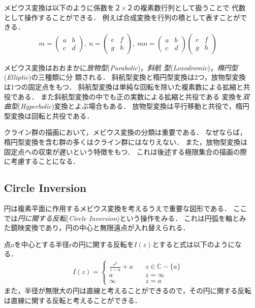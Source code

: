 メビウス変換は以下のように係数を２×２の複素数行列として扱うことで
代数として操作することができる．
例えば合成変換を行列の積として表すことができる．
\begin{align*}
  m = \left(
 \begin{array}{ccc}
  a & b \\
  c & d
 \end{array}
 \right),~
 n = \left(
 \begin{array}{ccc}
  e & f \\
  g & h
 \end{array}
 \right),~
 mn = \left(
 \begin{array}{ccc}
  a & b \\
  c & d
 \end{array}
 \right)
\left(
 \begin{array}{ccc}
  e & f \\
  g & h
 \end{array}
 \right)
\end{align*}

メビウス変換はおおまかに\emph{放物型}(\textit{Parabolic})，\emph{斜航
型}(\textit{Loxodromic})，\emph{楕円型}(\textit{Elliptic})の三種類に分
類される．
斜航型変換と楕円型変換は2つ，放物型変換は1つの固定点をもつ．
斜航型変換は単純な回転を除いた複素数による拡縮と共役である．
また斜航型変換の中でも正の実数による拡縮と共役である
変換を\emph{双曲型}(\textit{Hyperbolic})変換とよぶ場合もある．
放物型変換は平行移動と共役で，楕円型変換は回転と共役である．

クライン群の描画において，メビウス変換の分類は重要である．
なぜならば，楕円型変換を含む群の多くはクライン群にはなりえない．
また，放物型変換は固定点への収束が遅いという特徴をもつ．
これは後述する極限集合の描画の際に考慮することになる．

\subsection{Circle Inversion}

円は複素平面に作用するメビウス変換を考えるうえで重要な図形である．
ここでは\emph{円に関する反転}(\textit{Circle Inversion})という操作をみる．
これは円弧を軸とみた鏡映変換であり，円の中心と無限遠点が入れ替えられる．

点aを中心とする半径rの円に関する反転を$I(z)$とすると式は以下のようになる．
\begin{align*}
I(z) =
 \begin{cases}
  \frac{r^2}{\overline{z - a}} + a \quad & z \in \mathbb{C} - \{a\} \\
  a \quad & z = \infty\\
  \infty \quad & z = a
 \end{cases}
\end{align*}
また，半径が無限大の円は直線と考えることができるので，その円に関する反転
は直線に関する反転と考えることができる．

